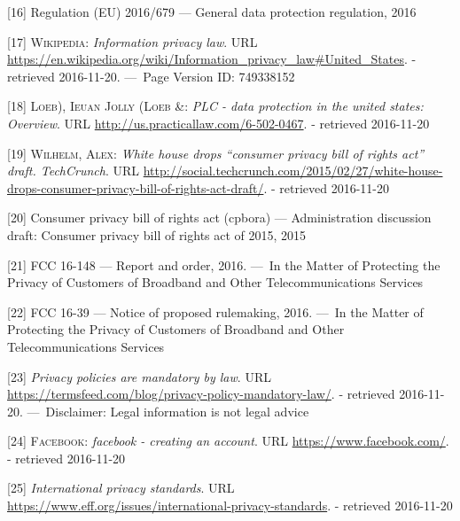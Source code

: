 \documentclass[12pt,english,a4paper,titlepage,cleardoublepage=empty,dottedtoc]{report}
\begin{document}
\hypertarget{ref-regulation_2016_eu_general-data-protection-regulation_definition}{}
{[}16{]} Regulation (EU) 2016/679 --- General data protection
regulation, 2016

\hypertarget{ref-web_2016_wikipedia_information-privacy-law_us}{}
{[}17{]} \textsc{Wikipedia}: \emph{Information privacy law}. URL
\url{https://en.wikipedia.org/wiki/Information_privacy_law\#United_States}.
- retrieved 2016-11-20. ---~Page Version ID: 749338152

\hypertarget{ref-web_2016_data-protection-laws-in-the-us}{}
{[}18{]} \textsc{Loeb), Ieuan Jolly (Loeb \&}: \emph{PLC - data
protection in the united states: Overview}. URL
\url{http://us.practicallaw.com/6-502-0467}. - retrieved 2016-11-20

\hypertarget{ref-web_2015_white-house-releases-consumer-privacy-bill-draft}{}
{[}19{]} \textsc{Wilhelm, Alex}: \emph{White house drops ``consumer
privacy bill of rights act'' draft. TechCrunch}. URL
\url{http://social.techcrunch.com/2015/02/27/white-house-drops-consumer-privacy-bill-of-rights-act-draft/}.
- retrieved 2016-11-20

\hypertarget{ref-bill-draft_2015_us_consumer-privacy-bill-of-rights-act_definition}{}
{[}20{]} Consumer privacy bill of rights act (cpbora) --- Administration
discussion draft: Consumer privacy bill of rights act of 2015, 2015

\hypertarget{ref-rules_2016_fcc_to-protect-broadband-consumer-privacy_sensitive-types-of-data}{}
{[}21{]} FCC 16-148 --- Report and order, 2016. ---~In the Matter of
Protecting the Privacy of Customers of Broadband and Other
Telecommunications Services

\hypertarget{ref-rules_2016_fcc_to-protect-broadband-consumer-privacy_personally-identifiable-information}{}
{[}22{]} FCC 16-39 --- Notice of proposed rulemaking, 2016. ---~In the
Matter of Protecting the Privacy of Customers of Broadband and Other
Telecommunications Services

\hypertarget{ref-web_2016_privacy-policies-are-mandatory-by-law}{}
{[}23{]} \emph{Privacy policies are mandatory by law}. URL
\url{https://termsfeed.com/blog/privacy-policy-mandatory-law/}. -
retrieved 2016-11-20. ---~Disclaimer: Legal information is not legal
advice

\hypertarget{ref-web_2016_facebooks-landing-page_policy-acknowledgement}{}
{[}24{]} \textsc{Facebook}: \emph{facebook - creating an account}. URL
\url{https://www.facebook.com/}. - retrieved 2016-11-20

\hypertarget{ref-web_2016_international-privacy-standards}{}
{[}25{]} \emph{International privacy standards}. URL
\url{https://www.eff.org/issues/international-privacy-standards}. -
retrieved 2016-11-20
\end{document}
